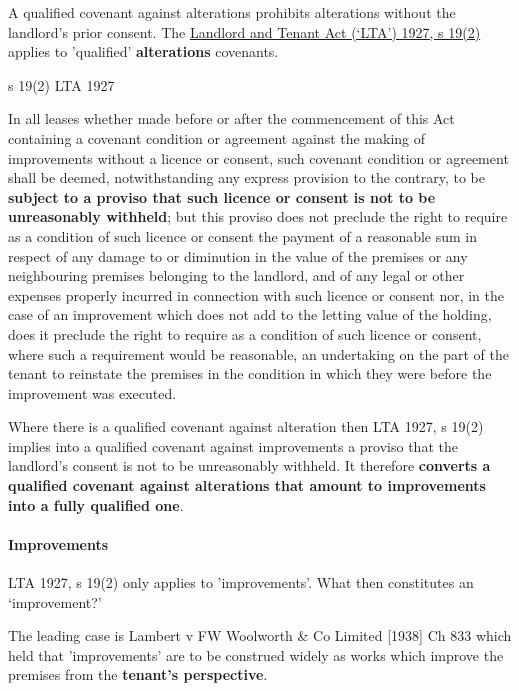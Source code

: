 \documentclass[
]{article}
\newenvironment{env-2aad614f-6fd6-4025-876c-fcdbeae766fb}
{
    \savenotes\tcolorbox[blanker,breakable,left=5pt,borderline west={2pt}{-4pt}{green}]
}
{
    \endtcolorbox\spewnotes
}
\begin{document}
A qualified covenant against alterations prohibits alterations without
the landlord's prior consent. The
\href{https://www.legislation.gov.uk/ukpga/Geo5/17-18/36/section/19}{Landlord
and Tenant Act (`LTA') 1927, s 19(2)} applies to 'qualified'
\textbf{alterations} covenants.

\begin{env-2aad614f-6fd6-4025-876c-fcdbeae766fb}

s 19(2) LTA 1927

In all leases whether made before or after the commencement of this Act
containing a covenant condition or agreement against the making of
improvements without a licence or consent, such covenant condition or
agreement shall be deemed, notwithstanding any express provision to the
contrary, to be \textbf{subject to a proviso that such licence or
consent is not to be unreasonably withheld}; but this proviso does not
preclude the right to require as a condition of such licence or consent
the payment of a reasonable sum in respect of any damage to or
diminution in the value of the premises or any neighbouring premises
belonging to the landlord, and of any legal or other expenses properly
incurred in connection with such licence or consent nor, in the case of
an improvement which does not add to the letting value of the holding,
does it preclude the right to require as a condition of such licence or
consent, where such a requirement would be reasonable, an undertaking on
the part of the tenant to reinstate the premises in the condition in
which they were before the improvement was executed.

\end{env-2aad614f-6fd6-4025-876c-fcdbeae766fb}

Where there is a qualified covenant against alteration then LTA 1927, s
19(2) implies into a qualified covenant against improvements a proviso
that the landlord's consent is not to be unreasonably withheld. It
therefore \textbf{converts a qualified covenant against alterations that
amount to improvements into a fully qualified one}.

\hypertarget{improvements}{%
\paragraph{Improvements}\label{improvements}}

LTA 1927, s 19(2) only applies to 'improvements'. What then constitutes
an `improvement?'

The leading case is Lambert v FW Woolworth \& Co Limited {[}1938{]} Ch
833 which held that 'improvements' are to be construed widely as works
which improve the premises from the \textbf{tenant's perspective}.
\end{document}
